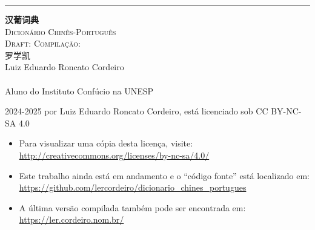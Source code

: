 
\begin{titlingpage}
  \raggedleft
  \rule{1pt}{\textheight}
  \hspace{0.1\textwidth}
  \parbox[b]{0.75\textwidth}{
    \vspace{0.05\textheight}
    {\HUGE\bfseries 汉葡词典}\\[2\baselineskip]%
    {\LARGE\textsc{Dicionário Chinês-Português}\\%
     \ifdraftdoc
     \large\textsc{Draft: \zhtoday \zhcurrtime}%
     \else
     \large\textsc{Compilação: \zhtoday}%
     \fi
    }\\[4\baselineskip]
    {\Large\textsc{罗学凯}\\%
     \small Luiz Eduardo Roncato Cordeiro}\\%
    \vspace{0.5\textheight}\\%
    {Aluno do Instituto Confúcio na UNESP}\\[\baselineskip]%
  }
  \newpage
  \raggedright
  \setlength{\parindent}{0pt}
  \setlength{\parskip}{\baselineskip}
  \mbox{}
  \vfill
  \footnotesize
  \textcopyright{} 2024-2025 por Luiz Eduardo Roncato Cordeiro, está licenciado sob CC BY-NC-SA 4.0\\
  \begin{itemize}
    \item Para visualizar uma cópia desta licença, visite:\\ \url{http://creativecommons.org/licenses/by-nc-sa/4.0/}
    \item Este trabalho ainda está em andamento e o ``código fonte'' está localizado em:\\ \url{https://github.com/lercordeiro/dicionario_chines_portugues}
    \item A última versão compilada também pode ser encontrada em:\\ \url{https://ler.cordeiro.nom.br/}
  \end{itemize}
\end{titlingpage}

